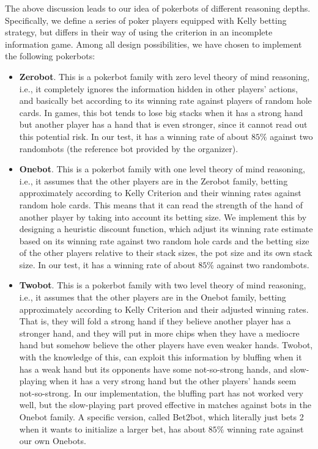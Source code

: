 \documentclass[11pt, oneside]{article}   	%
\begin{document}
The above discussion leads to our idea of pokerbots of different reasoning depths. Specifically, we define a series of poker players equipped with Kelly betting strategy, but differs in their way of using the criterion in an incomplete information game. Among all design possibilities, we have chosen to implement the following pokerbots:
\begin{itemize}
	\item \textbf{Zerobot}. This is a pokerbot family with zero level theory of mind reasoning, i.e., it completely ignores the information hidden in other players' actions, and basically bet according to its winning rate against players of random hole cards. In games, this bot tends to lose big stacks when it has a strong hand but another player has a hand that is even stronger, since it cannot read out this potential risk. In our test, it has a winning rate of about $85\%$ against two randombots (the reference bot provided by the organizer).
	\item \textbf{Onebot}. This is a pokerbot family with one level theory of mind reasoning, i.e., it assumes that the other players are in the Zerobot family, betting approximately according to Kelly Criterion and their winning rates against random hole cards. This means that it can read the strength of the hand of another player by taking into account its betting size. We implement this by designing a heuristic discount function, which adjust its winning rate estimate based on its winning rate against two random hole cards and the betting size of the other players relative to their stack sizes, the pot size and its own stack size. In our test, it has a winning rate of about $85\%$ against two randombots.
	\item \textbf{Twobot}. This is a pokerbot family with two level theory of mind reasoning, i.e., it assumes that the other players are in the Onebot family, betting approximately according to Kelly Criterion and their adjusted winning rates. That is, they will fold a strong hand if they believe another player has a stronger hand, and they will put in more chips when they have a mediocre hand but somehow believe the other players have even weaker hands. Twobot, with the knowledge of this, can exploit this information by bluffing when it has a weak hand but its opponents have some not-so-strong hands, and slow-playing when it has a very strong hand but the other players' hands seem not-so-strong. In our implementation, the bluffing part has not worked very well, but the slow-playing part proved effective in matches against bots in the Onebot family. A specific version, called Bet2bot, which literally just bets 2 when it wants to initialize a larger bet, has about $85\%$ winning rate against our own Onebots. 
\end{itemize}
\end{document}
